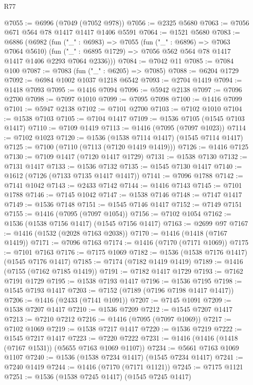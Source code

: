\begin{lexlean}{R77}
\begin{coremodule}
{{@7055 := @6996 (@7049 (@7052 @978))
@7056 := @2325 @5680
@7063 := @7056 @671 @564 @78 @1417 @1417 @1406 @5591
@7064 := @1521 @5680
@7083 := @6886
    (@6982
      (fun ("_" : @6983) =>
      @7055
        (fun ("_" : @6896) => @7063 @7064 @5610)
        (fun ("_" : @6895 @1729) => @7056 @562 @564 @78 @1417 @1417 @1406 @2293 @7064 @2336)))
@7084 := @7042 @11
@7085 := @7084 @100
@7087 := @7083 (fun ("_" : @6205) => @7085)
@7088 := @6204 @1729
@7092 := @6984 @1002 @1037 @1218 @6542
@7093 := @2704 @1419
@7094 := @1418 @7093
@7095 := @1416 @7094
@7096 := @5942 @2138
@7097 := @7096 @2700
@7098 := @7097 @1010
@7099 := @7095 @7098
@7100 := @1416 @7099
@7101 := @5947 @2138
@7102 := @7101 @2700
@7103 := @7102 @1010
@7104 := @1538 @7103
@7105 := @7104 @1417
@7109 := @1536 @7105 (@1545 @7103 @1417)
@7110 := @7109 @1419
@7113 := @1416 (@7095 (@7097 @1023))
@7114 := @7102 @1023
@7120 := @1536 (@1538 @7114 @1417) (@1545 @7114 @1417)
@7125 := @7100 (@7110 (@7113 (@7120 @1419 @1419)))
@7126 := @1416 @7125
@7130 := @7109 @1417 (@7120 @1417 @1729)
@7131 := @1538 @7130
@7132 := @7131 @1417
@7133 := @1536 @7132
@7135 := @1545 @7130 @1417
@7140 := @1612 (@7126 (@7133 @7135 @1417 @1417))
@7141 := @7096 @1788
@7142 := @7141 @1042
@7143 := @2433 @7142
@7144 := @1416 @7143
@7145 := @7101 @1788
@7146 := @7145 @1042
@7147 := @1538 @7146
@7148 := @7147 @1417
@7149 := @1536 @7148
@7151 := @1545 @7146 @1417
@7152 := @7149 @7151
@7155 := @1416 (@7095 (@7097 @1054))
@7156 := @7102 @1054
@7162 := @1536 (@1538 @7156 @1417) (@1545 @7156 @1417)
@7163 := @2699 @97
@7167 := @1416 (@1532 (@2028 @7163 @2038))
@7170 := @1416 (@1418 (@7167 @1419))
@7171 := @7096 @7163
@7174 := @1416 (@7170 (@7171 @1069))
@7175 := @7101 @7163
@7176 := @7175 @1069
@7182 := @1536 (@1538 @7176 @1417) (@1545 @7176 @1417)
@7185 := @7174 (@7182 @1419 @1419)
@7189 := @1416 (@7155 (@7162 @7185 @1419))
@7191 := @7182 @1417 @1729
@7193 := @7162 @7191 @1729
@7195 := @1538 @7193 @1417
@7196 := @1536 @7195
@7198 := @1545 @7193 @1417
@7203 := @7152 (@7189 (@7196 @7198 @1417 @1417))
@7206 := @1416 (@2433 (@7141 @1091))
@7207 := @7145 @1091
@7209 := @1538 @7207 @1417
@7210 := @1536 @7209
@7212 := @1545 @7207 @1417
@7213 := @7210 @7212
@7216 := @1416 (@7095 (@7097 @1069))
@7217 := @7102 @1069
@7219 := @1538 @7217 @1417
@7220 := @1536 @7219
@7222 := @1545 @7217 @1417
@7223 := @7220 @7222
@7231 := @1416 (@1416 (@1418 (@7167 @1531)) (@5655 @7163 @1069 @1107))
@7234 := @5661 @7163 @1069 @1107
@7240 := @1536 (@1538 @7234 @1417) (@1545 @7234 @1417)
@7241 := @7240 @1419
@7244 := @1416 (@7170 (@7171 @1121))
@7245 := @7175 @1121
@7251 := @1536 (@1538 @7245 @1417) (@1545 @7245 @1417)
}}
\end{coremodule}
\end{lexlean}
